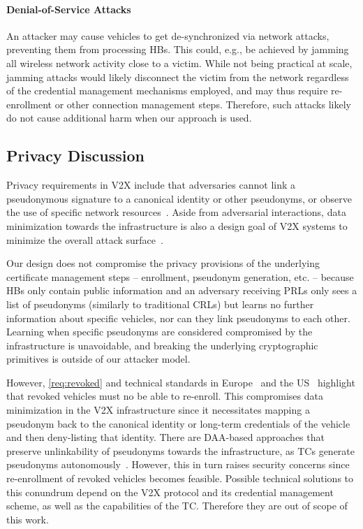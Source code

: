 \paragraph{Denial-of-Service Attacks}
%
An attacker may cause vehicles to get de-synchronized via network attacks,
preventing them from processing \acp{HB}. This could, e.g., be achieved by
jamming all wireless network activity close to a victim. While not being
practical at scale, jamming attacks would likely disconnect the victim from the
network regardless of the credential management mechanisms employed, and may
thus require re-enrollment or other connection management steps. Therefore, such
attacks likely do not cause additional harm when our approach is used.

\subsection{Privacy Discussion}
\label{section:discussion-privacy}

Privacy requirements in V2X include that adversaries cannot link a pseudonymous
signature to a canonical identity or other pseudonyms, or observe the use of
specific network resources~\cite{whitefield2017privacy, etsi2022102941,
yoshizawa2022v2x_survey}. Aside from adversarial interactions, data minimization
towards the infrastructure is also a design goal of V2X systems to minimize the
overall attack surface~\cite{brecht2018scms}.

Our design does not compromise the privacy provisions of the underlying
certificate management steps -- enrollment, pseudonym generation, etc. --
because \acp{HB} only contain public information and an adversary receiving
\acp{PRL} only sees a list of pseudonyms (similarly to traditional \acp{CRL})
but learns no further information about specific vehicles, nor can they link
pseudonyms to each other. Learning when specific pseudonyms are considered
compromised by the infrastructure is unavoidable, and breaking the underlying
cryptographic primitives is outside of our attacker model.

However, \cref{req:revoked} and technical standards in
Europe~\cite{etsi2022102941} and the US~\cite{brecht2018scms} highlight that
revoked vehicles must no be able to re-enroll. This compromises data
minimization in the V2X infrastructure since it necessitates mapping a pseudonym
back to the canonical identity or long-term credentials of the vehicle and then
deny-listing that identity.
%
There are DAA-based approaches that preserve unlinkability of pseudonyms towards
the infrastructure, as \acp{TC} generate pseudonyms
autonomously~\cite{whitefield2017privacy,desmoulins2019practical}. However, this
in turn raises security concerns since re-enrollment of revoked vehicles becomes
feasible. Possible technical solutions to this conundrum depend on the V2X
protocol and its credential management scheme, as well as the capabilities of
the TC. Therefore they are out of scope of this work.
